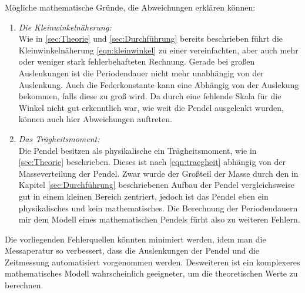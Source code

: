 Mögliche mathematische Gründe, die Abweichungen erklären können:
\begin{enumerate}
    \item \textit{Die Kleinwinkelnäherung:}\\
        Wie in \ref{sec:Theorie} und \ref{sec:Durchführung} bereits beschrieben führt die Kleinwinkelnäherung \eqref{eqn:kleinwinkel}
        zu einer vereinfachten, aber auch mehr oder weniger stark fehlerbehafteten Rechnung. Gerade bei großen Auslenkungen ist die
        Periodendauer nicht mehr unabhängig von der Auslenkung. Auch die Federkonstante kann eine Abhängig von
        der Auslekung bekommen, falls diese zu groß wird. Da durch eine fehlende Skala für die Winkel nicht gut erkenntlich war,
        wie weit die Pendel ausgelenkt wurden, können auch hier Abweichungen auftreten.
    \item \textit{Das Trägheitsmoment:}\\
        Die Pendel besitzen als physikalische ein Trägheitsmoment, wie in \ref{sec:Theorie} beschrieben. Dieses ist nach 
        \eqref{eqn:traegheit} abhängig von der Masseverteilung der Pendel. Zwar wurde der Großteil der Masse durch den in 
        Kapitel \ref{sec:Durchführung} beschriebenen Aufbau der Pendel vergleichsweise gut in einem kleinen Bereich zentriert,
        jedoch ist das Pendel eben ein physikalisches und kein mathematisches. Die Berechnung der Periodendauern mir dem 
        Modell eines mathematischen Pendels fürht also zu weiteren Fehlern.  
\end{enumerate}
Die vorliegenden Fehlerquellen könnten minimiert werden, idem man die Messaperatur so verbessert, dass die Auslenkungen der Pendel
und die Zeitmessung automatisiert vorgenommen werden. Desweiteren ist ein komplexeres mathematisches Modell wahrscheinlich geeigneter,
um die theoretischen Werte zu berechnen.